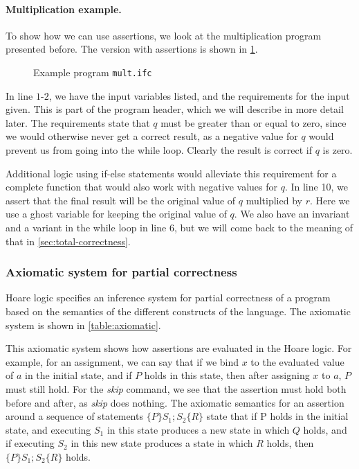 \paragraph{Multiplication example.}
To show how we can use assertions, we look at the multiplication program presented before. The version with assertions is shown in \cref{figure:mult}.
\begin{figure}

\caption{Example program \texttt{mult.ifc}}
\label{figure:mult}
\end{figure}

In line $1$-$2$, we have the input variables listed, and the requirements for the input given.
This is part of the program header, which we will describe in more detail later.
The requirements state that $q$ must be greater than or equal to zero, since we would otherwise never get a correct result, as a negative value for $q$ would prevent us from going into the while loop. 
Clearly the result is correct if $q$ is zero.

Additional logic using if-else statements would alleviate this requirement for a complete function that would also work with negative values for $q$.
In line 10, we assert that the final result will be the original value of $q$ multiplied by $r$.
Here we use a ghost variable for keeping the original value of $q$.
We also have an invariant and a variant in the while loop in line 6, but we will come back to the meaning of that in \cref{sec:total-correctness}.


\subsubsection{Axiomatic system for partial correctness}
Hoare logic specifies an inference system for partial correctness of a program based on the semantics of the different constructs of the language. The axiomatic system is shown in \cref{table:axiomatic}.

This axiomatic system shows how assertions are evaluated in the Hoare logic.
For example, for an assignment, we can say that if we bind $x$ to the evaluated value of $a$ in the initial state, and if $P$ holds in this state, then after assigning $x$ to $a$, $P$ must still hold.
For the \textit{skip} command, we see that the assertion must hold both before and after, as \textit{skip} does nothing.
The axiomatic semantics for an assertion around a sequence of statements $\{P\} S_1;S_2\{R\}$ state that if P holds in the initial state, and executing $S_1$ in this state produces a new state in which $Q$ holds, and if executing $S_2$ in this new state produces a state in which $R$ holds, then $\{P\} S_1;S_2 \{R\}$ holds.

